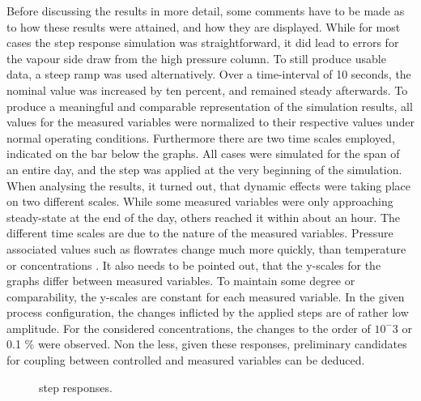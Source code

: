             Before discussing the results in more detail, some comments have to be made as to how these results
            were attained, and how they are displayed. While for most cases the step response simulation was
            straightforward, it did lead to errors for the vapour side draw from the high pressure column. To still
            produce usable data, a steep ramp was used alternatively. Over a time-interval of 10 seconds, the nominal
            value was increased  by ten percent, and remained steady afterwards. To produce a meaningful and comparable
            representation of the simulation results, all values for the measured variables were normalized to their
            respective values under normal operating conditions. Furthermore there are two time scales employed, indicated
            on the bar below the graphs. All cases were simulated for the span of an entire day, and the step was applied
            at the very beginning of the simulation. When analysing the results, it turned out, that dynamic effects were
            taking place on two different scales. While some measured variables were only approaching steady-state
            at the end of the day, others reached it within about an hour. The different time scales are due to the
            nature of the measured variables. Pressure associated values such as flowrates change much more quickly,
            than temperature or concentrations \cite{Roffel.2000}. It also needs to be pointed out, that the y-scales
            for the graphs differ between measured variables. To maintain some degree or comparability,
            the y-scales are constant for each measured variable. In the given process configuration, the changes
            inflicted by the applied steps are of rather low amplitude. For the considered concentrations, the changes
            to the order of $10^-{3}$ or 0.1 \% were observed. Non the less, given these responses, preliminary candidates
            for coupling between controlled and measured variables can be deduced.

            \begin{landscape}
                \begin{figure}
                    \center
                    
                    \caption{step responses.}
                    \label{fig:opt:stepresp}
                \end{figure}
            \end{landscape}


